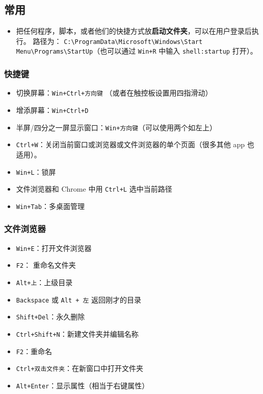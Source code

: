 
\subsection{常用}
\begin{itemize}
\item 把任何程序，脚本，或者他们的快捷方式放\textbf{启动文件夹}，可以在用户登录后执行。 路径为： \verb|C:\ProgramData\Microsoft\Windows\Start Menu\Programs\StartUp|（也可以通过 \verb|Win+R| 中输入 \verb|shell:startup| 打开）。
\end{itemize}

\subsubsection{快捷键}
\begin{itemize}
\item 切换屏幕：\verb|Win+Ctrl+方向键| （或者在触控板设置用四指滑动）
\item 增添屏幕：\verb|Win+Ctrl+D|
\item 半屏/四分之一屏显示窗口：\verb|Win+方向键|（可以使用两个如左上）
\item \verb|Ctrl+W|：关闭当前窗口或浏览器或文件浏览器的单个页面（很多其他 app 也适用）。
\item \verb|Win+L|：锁屏
\item 文件浏览器和 Chrome 中用 \verb|Ctrl+L| 选中当前路径
\item \verb|Win+Tab|：多桌面管理
\end{itemize}

\subsubsection{文件浏览器}
\begin{itemize}
\item \verb|Win+E|：打开文件浏览器
\item \verb`F2`： 重命名文件夹
\item \verb|Alt+上|：上级目录
\item \verb|Backspace| 或 \verb|Alt + 左| 返回刚才的目录
\item \verb|Shift+Del|：永久删除
\item \verb|Ctrl+Shift+N|：新建文件夹并编辑名称
\item \verb|F2|：重命名
\item \verb|Ctrl+双击文件夹|：在新窗口中打开文件夹
\item \verb`Alt+Enter`：显示属性（相当于右键属性）
\end{itemize}

